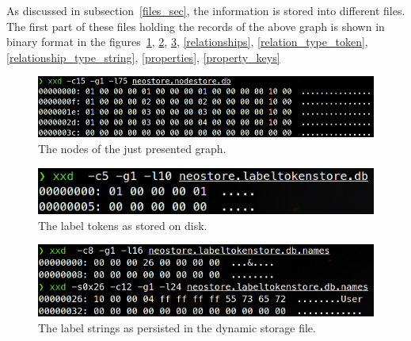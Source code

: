\documentclass[a4paper,10pt]{article}
\begin{document}
    As discussed in subsection~\ref{files_sec}, the information is stored into different files. The first part of these files holding the records of the above graph is shown in binary format in the figures~\ref{nodes}, \ref{label_tokens}, \ref{label_strings}, \ref{relationships}, \ref{relation_type_token}, \ref{relationship_type_string}, \ref{properties}, \ref{property_keys}
    \begin{figure}[htp]\label{nodes}
        \begin{center}
            \includegraphics[keepaspectratio,height=1.2\textheight,width=1.2\textwidth]{img/04_example/nodes.png}
        \end{center}
        \caption{The nodes of the just presented graph.} %
    \end{figure}
    \begin{figure}[htp]\label{label_tokens}
        \begin{center}
            \includegraphics[keepaspectratio,height=1.2\textheight,width=1.2\textwidth]{img/04_example/label_token.png}
        \end{center}
        \caption{The label tokens as stored on disk.} %
    \end{figure}
    \begin{figure}[htp]\label{label_strings}
        \begin{center}
            \includegraphics[keepaspectratio,height=1.2\textheight,width=1.2\textwidth]{img/04_example/labels_string_dynamic.png}
        \end{center}
        \caption{The label strings as persisted in the dynamic storage file.} %
    \end{figure}
\end{document}
